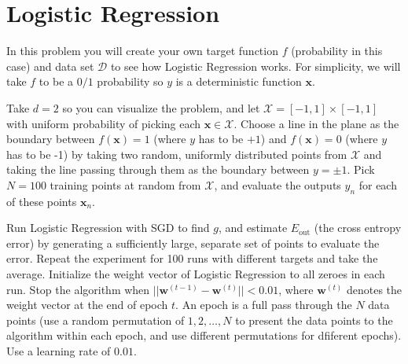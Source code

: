 \documentclass[answers]{exam}
\begin{document}
\section*{Logistic Regression}

In this problem you will create your own target function $f$ (probability
in this case) and data set $\mathcal{D}$ to see how Logistic Regression works.
For simplicity, we will take $f$ to be a $0 / 1$ probability so $y$ is a 
deterministic function $\textbf{x}$.

Take $d=2$ so you can visualize the problem, and let $\mathcal{X}=[-1, 1]
\times [-1,1]$ with uniform probability of picking each $\textbf{x} \in 
\mathcal{X}$. Choose a line in the plane as the boundary between $f(\textbf{x})
=1$ (where $y$ has to be $+1$) and $f(\textbf{x}) = 0$ (where $y$ has to be -1)
by taking two random, uniformly distributed points from $\mathcal{X}$ and taking
the line passing through them as the boundary between $y=\pm 1$. Pick $N=100$
training points at random from $\mathcal{X}$, and evaluate the outputs $y_{n}$
for each of these points $\textbf{x}_{n}$.

Run Logistic Regression with SGD to find $g$, and estimate $E_{\text{out}}$ (the
cross entropy error) by generating a sufficiently large, separate set of points
to evaluate the error. Repeat the experiment for 100 runs with different targets
and take the average. Initialize the weight vector of Logistic Regression to all
zeroes in each run. Stop the algorithm when $||\textbf{w}^{(t-1)}-\textbf{w}^{(t)}||
< 0.01$, where $\textbf{w}^{(t)}$ denotes the weight vector at the end of epoch
$t$. An epoch is a full pass through the $N$ data points (use a random permutation
of $1,2,\ldots,N$ to present the data points to the algorithm within each epoch,
and use different permutations for dfiferent epochs). Use a learning rate of 
$0.01$.
\end{document}

